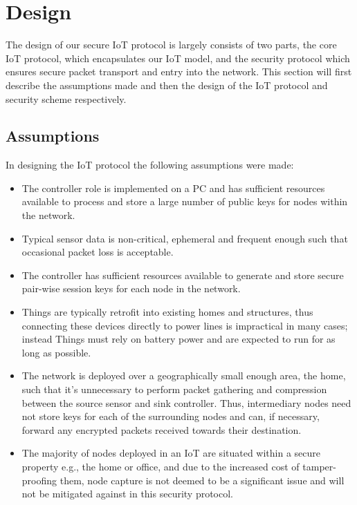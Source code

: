 \documentclass[conference]{./sty/IEEEtran}
\begin{document}

\section{Design} %
\label{sec:design}
The design of our secure IoT protocol is largely consists of two parts, the core IoT protocol, which encapsulates our IoT model, and the security protocol which ensures secure packet transport and entry into the network. This section will first describe the assumptions made and then the design of the IoT protocol and security scheme respectively.

\subsection{Assumptions} %
\label{sub:assumptions}
In designing the IoT protocol the following assumptions were made:
\begin{itemize}
  \item The controller role is implemented on a PC and has sufficient resources available to process and store a large number of public keys for nodes within the network.
  \item Typical sensor data is non-critical, ephemeral and frequent enough such that occasional packet loss is acceptable.
  \item The controller has sufficient resources available to generate and store secure pair-wise session keys for each node in the network.
  \item Things are typically retrofit into existing homes and structures, thus connecting these devices directly to power lines is impractical in many cases; instead Things must rely on battery power and are expected to run for as long as possible.  
  \item The network is deployed over a geographically small enough area, the home, such that it's unnecessary to perform packet gathering and compression between the source sensor and sink controller. Thus, intermediary nodes need not store keys for each of the surrounding nodes and can, if necessary, forward any encrypted packets received towards their destination.
  \item The majority of nodes deployed in an IoT are situated within a secure property e.g., the home or office, and due to the increased cost of tamper-proofing them, node capture is not deemed to be a significant issue and will not be mitigated against in this security protocol.
\end{itemize}
\end{document}
